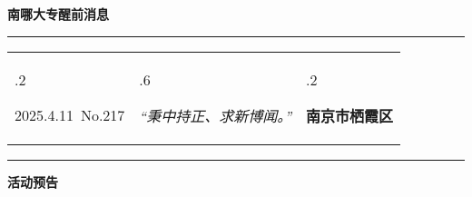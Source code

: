 \documentclass[letterpaper, 12pt]{article}
\begin{document}
\begin{center}
    \Huge\textbf{南哪大专醒前消息}
\end{center}
\vspace{4mm}
\hrule
\renewcommand\tabularxcolumn[1]{m{#1}}
\begin{tabularx}{\textwidth}{>{\hsize.2\hsize}X>{\hsize.6\hsize}X>{\hsize.2\hsize}X}
    \begin{flushleft}
        2025.4.11\, No.217
    \end{flushleft}
    &
    \begin{center}
        \textit{“秉中持正、求新博闻。”}
    \end{center}
    &
    \begin{flushright}
        \textbf{南京市栖霞区}
    \end{flushright}
\end{tabularx}
\vspace{-3.5mm}
\hrule
\vspace{4mm}
\centerline{\huge\textbf{活动预告}}
\end{document}
